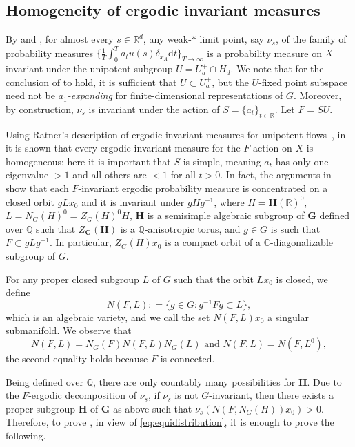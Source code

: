\documentclass[12pt,reqno]{amsart}
\newcommand{\defeq}{\mathrel{\mathop:}=}
\numberwithin{equation}{section}
\theoremstyle{plain}
\theoremstyle{definition}
\theoremstyle{remark}
\newcommand\bfG{\mathbf{G}}
\newcommand\bfH{\mathbf{H}}
\newcommand{\R}{\mathbb{R}}
\newcommand{\C}{\mathbb{C}}
\newcommand{\Q}{\mathbb{Q}}
\newcommand{\de}{\mathrm{d}}
\begin{document}
	\subsection{Homogeneity of ergodic invariant measures} \label{subsect: avoidance of singular sets}
	By  and \cite[Proposition 2.2]{Shi20}, for almost every $s\in\R^d$, any weak-$\ast$ limit point, say $\nu_s$, of the family of probability measures 
    $\{\frac{1}{T}\int_{0}^{T}a_tu(s)\delta_{x_A}\de t\}_{T\to\infty}$ 
    is a probability measure on $X$ invariant under the unipotent subgroup $U=U_a^+\cap H_d$. We note that for the conclusion of \cite[Proposition 2.2]{Shi20} to hold, it is sufficient that $U\subset U_a^+$, but the $U$-fixed point subspace need not be {\it $a_1$-expanding\/} for finite-dimensional representations of $G$. Moreover, by construction, $\nu_s$ is invariant under the action of $S=\{a_t\}_{t\in\R}$. Let $F=SU$. 
	
	Using Ratner's description of ergodic invariant measures for unipotent flows~\cite{Ratner:measure}, in \cite{EinsiedlerShi19} it is shown that every ergodic invariant measure for the $F$-action on $X$ is homogeneous; here it is important that $S$ is simple, meaning $a_t$ has only one eigenvalue $>1$ and all others are $<1$ for all $t>0$. In fact, the arguments in \cite[Proof of Theorem~1.1, p.427]{EinsiedlerShi19} show that each $F$-invariant ergodic probability measure is concentrated on a closed orbit $gLx_0$ and it is invariant under $gHg^{-1}$, where $H=\bfH(\R)^0$, $L=N_G(H)^0=Z_G(H)^0H$, $\bfH$ is a semisimple algebraic subgroup of $\bfG$ defined over $\Q$ such that $Z_\bfG(\bfH)$ is a $\Q$-anisotropic torus, and $g\in G$ is such that $F\subset gLg^{-1}$. In particular, $Z_G(H)x_0$ is a compact orbit of a $\C$-diagonalizable subgroup of $G$. 
    
    For any proper closed subgroup $L$ of $G$ such that the orbit $Lx_0$ is closed, we define
	\begin{equation} \label{eq:NFL}
	N(F,L)\defeq \{g\in G\colon g^{-1}Fg\subset L\},
	\end{equation}
which is an algebraic variety, and we call the set $N(F,L)x_0$ a singular submanifold. We observe that 
\begin{equation} \label{eq:NFL-nor}
	N(F,L)=N_G(F)N(F,L)N_G(L) \text{ and } N(F,L)=N(F,L^0),
	\end{equation}
    the second equality holds because $F$ is connected. 
    
Being defined over $\Q$, there are only countably many possibilities for $\bfH$. Due to the $F$-ergodic decomposition of $\nu_s$, if $\nu_s$ is not $G$-invariant, then there exists a proper subgroup $\bfH$ of $\bfG$ as above such that 
$
\nu_s(N(F,N_G(H))x_0)>0
$.
Therefore, to prove , in view of \eqref{eq:equidistribution}, it is enough to prove the following.
\end{document}
